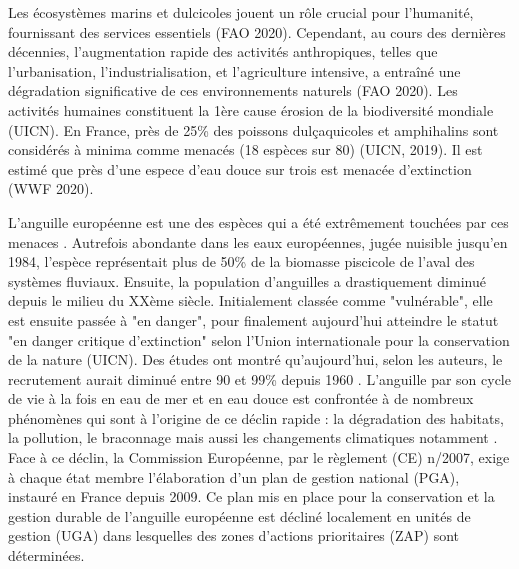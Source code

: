 \documentclass[11pt,titlepage,twoside]{article}\usepackage[]{graphicx}\usepackage[table]{xcolor}
\begin{document}
Les écosystèmes marins et dulcicoles jouent un rôle crucial pour l’humanité, fournissant des services essentiels (FAO 2020).
Cependant, au cours des dernières décennies, l'augmentation rapide des activités anthropiques, telles que l'urbanisation, l'industrialisation, et l'agriculture intensive, a entraîné une dégradation significative de ces environnements naturels (FAO 2020).
Les activités humaines constituent la 1ère cause érosion de la biodiversité mondiale (UICN).
En France, près de 25\% des poissons dulçaquicoles et amphihalins sont considérés à minima comme menacés (18 espèces sur 80) (UICN, 2019).
Il est estimé que près d’une espece d’eau douce sur trois est menacée d’extinction (WWF 2020).

L’anguille européenne est une des espèces qui a été extrêmement touchées par ces menaces \citep{dekker_climbing_2016}. Autrefois abondante dans les eaux européennes, jugée nuisible jusqu’en 1984, l’espèce représentait plus de 50\% de la biomasse piscicole de l’aval des systèmes fluviaux.
Ensuite, la population d'anguilles a drastiquement diminué depuis le milieu du XXème siècle. Initialement classée comme "vulnérable", elle est ensuite passée à "en danger", pour finalement aujourd’hui atteindre le statut "en danger critique d'extinction" selon l'Union internationale pour la conservation de la nature (UICN). Des études ont montré qu’aujourd’hui, selon les auteurs, le recrutement aurait diminué entre 90 et 99\% depuis 1960 \citep{feunteun_review_2003,baisez_outil_2005}.
L’anguille par son cycle de vie à la fois en eau de mer et en eau douce est confrontée à de nombreux phénomènes
qui sont à l’origine de ce déclin rapide : la dégradation des habitats, la pollution, le braconnage mais aussi les
changements climatiques notamment \citep{dekker_worldwide_2003}.
Face à ce déclin, la Commission Européenne, par le règlement (CE) n/2007, exige à chaque état membre l'élaboration d'un plan de gestion national (PGA), instauré en France depuis 2009.
Ce plan mis en place pour la conservation et la gestion durable de l'anguille européenne est décliné localement en unités de gestion (UGA) dans lesquelles des zones d'actions prioritaires (ZAP) sont déterminées.
\end{document}
